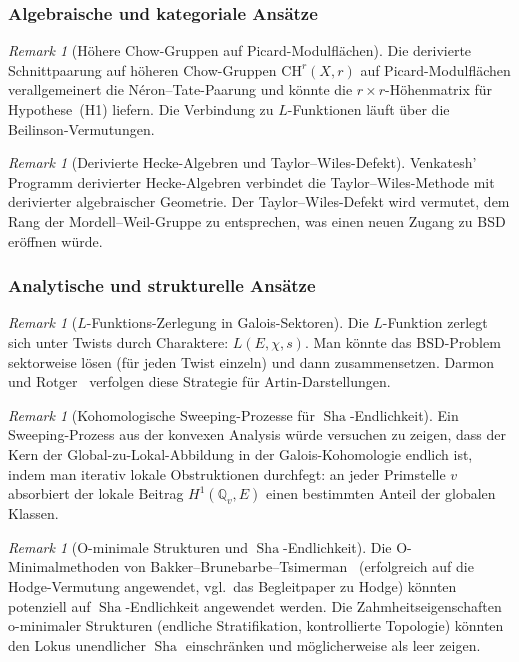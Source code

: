 \documentclass[aps,prd,twocolumn,superscriptaddress,nofootinbib,floatfix]{revtex4-2}
\theoremstyle{definition}
\theoremstyle{remark}
\newtheorem{remark}[theorem]{Remark}
\DeclareMathOperator{\Sha}{Sha}
\begin{document}
\subsubsection{Algebraische und kategoriale Ansätze}

\begin{remark}[Höhere Chow-Gruppen auf Picard-Modulflächen]
\label{rem:chow-groups}
Die derivierte Schnittpaarung auf höheren Chow-Gruppen $\mathrm{CH}^r(X, r)$ auf Picard-Modulflächen verallgemeinert die Néron--Tate-Paarung und könnte die $r \times r$-Höhenmatrix für Hypothese~(H1) liefern. Die Verbindung zu $L$-Funktionen läuft über die Beilinson-Vermutungen.
\end{remark}

\begin{remark}[Derivierte Hecke-Algebren und Taylor--Wiles-Defekt]
\label{rem:derived-hecke}
Venkatesh' Programm derivierter Hecke-Algebren verbindet die Taylor--Wiles-Methode mit derivierter algebraischer Geometrie. Der \glqq Taylor--Wiles-Defekt\grqq{} wird vermutet, dem Rang der Mordell--Weil-Gruppe zu entsprechen, was einen neuen Zugang zu BSD eröffnen würde.
\end{remark}

\subsubsection{Analytische und strukturelle Ansätze}

\begin{remark}[$L$-Funktions-Zerlegung in Galois-Sektoren]
\label{rem:galois-sectors}
Die $L$-Funktion zerlegt sich unter Twists durch Charaktere: $L(E, \chi, s)$. Man könnte das BSD-Problem sektorweise lösen (für jeden Twist einzeln) und dann zusammensetzen. Darmon und Rotger~\cite{DarmonRotger2017} verfolgen diese Strategie für Artin-Darstellungen.
\end{remark}

\begin{remark}[Kohomologische Sweeping-Prozesse für $\Sha$-Endlichkeit]
\label{rem:sweeping-sha}
Ein \glqq Sweeping-Prozess\grqq{} aus der konvexen Analysis würde versuchen zu zeigen, dass der Kern der Global-zu-Lokal-Abbildung in der Galois-Kohomologie endlich ist, indem man iterativ lokale Obstruktionen \glqq durchfegt\grqq{}: an jeder Primstelle $v$ absorbiert der lokale Beitrag $H^1(\mathbb{Q}_v, E)$ einen bestimmten Anteil der globalen Klassen.
\end{remark}

\begin{remark}[O-minimale Strukturen und \texorpdfstring{$\Sha$}{Sha}-Endlichkeit]
\label{rem:o-minimal-sha}
Die O-Minimalmethoden von Bakker--\allowbreak Brunebarbe--\allowbreak Tsimerman~\cite{BBT2023} (erfolgreich auf die Hodge-Vermutung angewendet, vgl.\ das Begleitpaper zu Hodge) könnten potenziell auf $\Sha$-Endlichkeit angewendet werden. Die Zahmheitseigenschaften o-minimaler Strukturen (endliche Stratifikation, kontrollierte Topologie) könnten den Lokus unendlicher $\Sha$ einschränken und möglicherweise als leer zeigen.
\end{remark}
\end{document}
